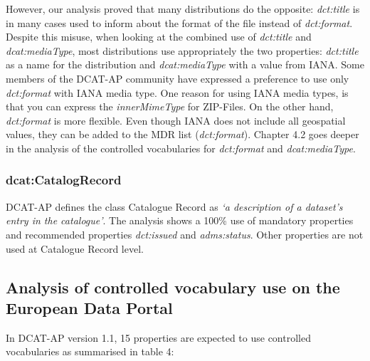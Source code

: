 \documentclass[<options>]{elsarticle}
\begin{document}
However, our analysis proved that many distributions do the opposite: \textit{dct:title} is in many cases used to inform about the format of the file instead of \textit{dct:format}. Despite this misuse, when looking at the combined use of \textit{dct:title} and \textit{dcat:mediaType}, most distributions use appropriately the two properties: \textit{dct:title} as a name for the distribution and \textit{dcat:mediaType} with a value from IANA. Some members of the DCAT-AP community have expressed a preference to use only \textit{dct:format} with IANA media type. One reason for using IANA media types, is that you can express the \textit{innerMimeType} for ZIP-Files. On the other hand, \textit{dct:format} is more flexible. Even though IANA does not include all geospatial values, they can be added to the MDR list (\textit{dct:format}). Chapter 4.2 goes deeper in the analysis of the controlled vocabularies for \textit{dct:format} and \textit{dcat:mediaType}. 

\subsubsection{dcat:CatalogRecord}
DCAT-AP defines the class Catalogue Record as \textit{‘a description of a dataset’s entry in the catalogue’}. The analysis shows a 100\% use of mandatory properties and recommended properties \textit{dct:issued} and \textit{adms:status}. Other properties are not used at Catalogue Record level.

\subsection{Analysis of controlled vocabulary use on the European Data Portal}
In DCAT-AP version 1.1, 15 properties are expected to use controlled vocabularies as summarised in table 4: 
\end{document}
